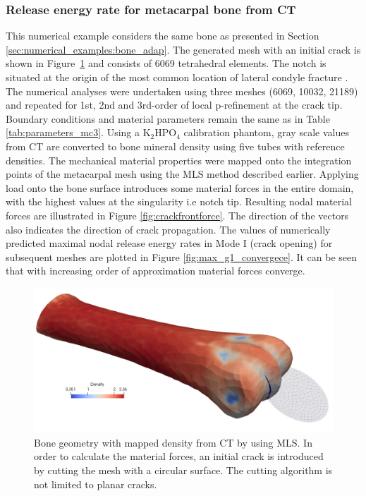 \documentclass[11pt]{acmeArticle}
\numberwithin{equation}{section}
\begin{document}
\subsubsection{Release energy rate for metacarpal bone from CT}
This numerical example considers the same bone as presented in Section \ref{sec:numerical_examples:bone_adap}. The generated mesh with an initial crack is shown in Figure~\ref{fig:bone_ct_mesh_cut} and consists of 6069 tetrahedral elements. The notch is situated at the origin of the most common location of lateral condyle fracture \citep{jacklin2012frequency}. The numerical analyses were undertaken using three meshes (6069, 10032, 21189) and repeated for 1st, 2nd and 3rd-order of local p-refinement at the crack tip. Boundary conditions and material parameters remain the same as in Table \ref{tab:parameters_mc3}. Using a $ \mathrm {K_2 HPO_4  }$ calibration phantom, gray scale values from CT are converted to bone mineral density using five tubes with reference densities. The mechanical material properties were mapped onto the integration points of the metacarpal mesh using the MLS method described earlier. Applying load onto the bone surface introduces some material forces in the entire domain, with the highest values at the singularity i.e notch tip. Resulting nodal material forces are illustrated in Figure \ref{fig:crackfrontforce}. The direction of the vectors also indicates the direction of crack propagation.
The values of numerically predicted maximal nodal release energy rates in Mode I (crack opening) for subsequent meshes are plotted in Figure \ref{fig:max_g1_convergece}. It can be seen that with increasing order of approximation material forces converge.
\begin{figure}
	\centering
	\includegraphics[width=0.5\linewidth]{Figures/bone_ct_mesh_cut.png}
	\caption{Bone geometry with mapped density from CT by using MLS. In order to calculate the material forces, an initial crack is introduced by cutting the mesh with a circular surface. The cutting algorithm is not limited to planar cracks. }
	\label{fig:bone_ct_mesh_cut}
\end{figure}
\end{document}
